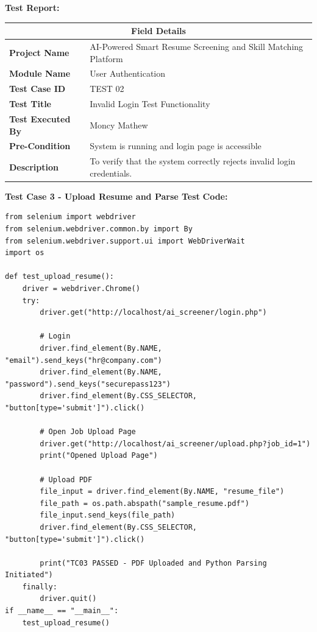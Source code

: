 \documentclass[12pt,a4paper]{report}
\begin{document}
\textbf{Test Report:}
\begin{table}[H]
\centering
\renewcommand{\arraystretch}{1.5}
\begin{tabular}{|p{4.5cm}|p{9.5cm}|}
\hline
\multicolumn{2}{|c|}{\textbf{Field Details}} \\ \hline
\textbf{Project Name} & AI-Powered Smart Resume Screening and Skill Matching Platform \\ \hline
\textbf{Module Name} & User Authentication \\ \hline
\textbf{Test Case ID} & TEST 02 \\ \hline
\textbf{Test Title} & Invalid Login Test Functionality \\ \hline
\textbf{Test Executed By} & Moncy Mathew \\ \hline
\textbf{Pre-Condition} & System is running and login page is accessible \\ \hline
\textbf{Description} & To verify that the system correctly rejects invalid login credentials. \\ \hline
\end{tabular}
\end{table}
\vspace{0.5cm}
\textbf{Test Case 3 - Upload Resume and Parse Test}
\textbf{Code:}
\begin{verbatim}
from selenium import webdriver
from selenium.webdriver.common.by import By
from selenium.webdriver.support.ui import WebDriverWait
import os

def test_upload_resume():
    driver = webdriver.Chrome()
    try:
        driver.get("http://localhost/ai_screener/login.php")
        
        # Login
        driver.find_element(By.NAME, "email").send_keys("hr@company.com")
        driver.find_element(By.NAME, "password").send_keys("securepass123")
        driver.find_element(By.CSS_SELECTOR, "button[type='submit']").click()
        
        # Open Job Upload Page
        driver.get("http://localhost/ai_screener/upload.php?job_id=1")
        print("Opened Upload Page")
        
        # Upload PDF
        file_input = driver.find_element(By.NAME, "resume_file")
        file_path = os.path.abspath("sample_resume.pdf")
        file_input.send_keys(file_path)
        driver.find_element(By.CSS_SELECTOR, "button[type='submit']").click()
        
        print("TC03 PASSED - PDF Uploaded and Python Parsing Initiated")
    finally:
        driver.quit()
if __name__ == "__main__":
    test_upload_resume()
\end{verbatim}
\end{document}
